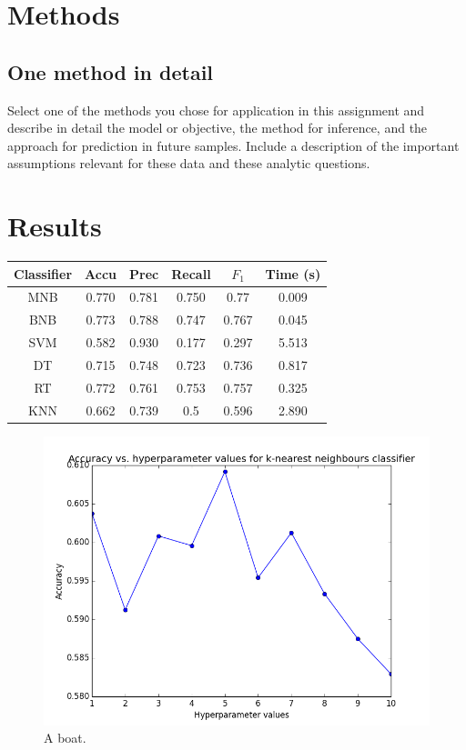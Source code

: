 \documentclass{article} %
\begin{document}
\section{Methods}

\subsection{One method in detail}

Select one of the methods you chose for application in this assignment and describe in detail the model or objective, the method for inference, and the approach for prediction in future samples. Include a description of the important assumptions relevant for these data and these analytic questions.

\section{Results}

\small
   \centering
   \begin{tabular}{@{}|c|c|c|c|c|c|@{}} %
   \hline

   Classifier & Accu & Prec & Recall & $F_1$ & Time (s) \\ \hline 
      MNB & 0.770 & 0.781 & 0.750 & 0.77 & 0.009 \\
       BNB & 0.773 &  0.788 & 0.747 & 0.767 & 0.045\\
      SVM    &  0.582 & 0.930 & 0.177 & 0.297 & 5.513\\
        DT  &  0.715 & 0.748 & 0.723 & 0.736 & 0.817 \\
      RT &  0.772 & 0.761 & 0.753 & 0.757 & 0.325  \\
      KNN &  0.662 & 0.739 & 0.5 & 0.596 & 2.890 \\
     \hline
   \end{tabular}
   \label{tab:classifiers}

\begin{figure}
\centering
  \includegraphics[width=0.5\linewidth]{hyperparameter_fitting_k_nearest.png}
  \caption{A boat.}
  \label{fig:boat1}
\end{figure}
\end{document}
